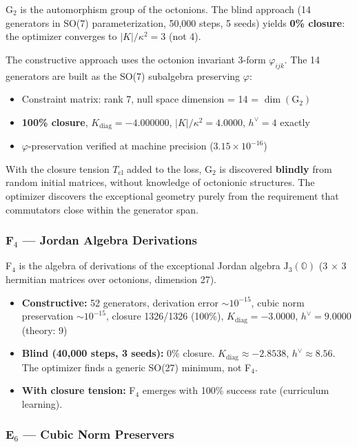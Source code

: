 G$_2$ is the automorphism group of the octonions. The blind approach (14 generators in SO(7) parameterization, 50,000 steps, 5 seeds) yields \textbf{0\% closure}: the optimizer converges to $|K|/\kappa^2 = 3$ (not 4).

The constructive approach uses the octonion invariant 3-form $\varphi_{ijk}$. The 14 generators are built as the SO(7) subalgebra preserving $\varphi$:

\begin{itemize}
\item Constraint matrix: rank 7, null space dimension = 14 = $\dim(\text{G}_2)$
\item \textbf{100\% closure}, $K_{\mathrm{diag}} = -4.000000$, $|K|/\kappa^2 = 4.0000$, $h^\vee = 4$ exactly
\item $\varphi$-preservation verified at machine precision ($3.15 \times 10^{-16}$)
\end{itemize}

With the closure tension $T_{\mathrm{cl}}$ added to the loss, G$_2$ is discovered \textbf{blindly} from random initial matrices, without knowledge of octonionic structures. The optimizer discovers the exceptional geometry purely from the requirement that commutators close within the generator span.

\subsubsection{F$_4$ --- Jordan Algebra Derivations}

F$_4$ is the algebra of derivations of the exceptional Jordan algebra $\mathrm{J}_3(\mathbb{O})$ (3 $\times$ 3 hermitian matrices over octonions, dimension 27).

\begin{itemize}
\item \textbf{Constructive:} 52 generators, derivation error $\sim 10^{-15}$, cubic norm preservation $\sim 10^{-15}$, closure 1326/1326 (100\%), $K_{\mathrm{diag}} = -3.0000$, $h^\vee = 9.0000$ (theory: 9)
\item \textbf{Blind (40,000 steps, 3 seeds):} 0\% closure. $K_{\mathrm{diag}} \approx -2.8538$, $h^\vee \approx 8.56$. The optimizer finds a generic SO(27) minimum, not F$_4$.
\item \textbf{With closure tension:} F$_4$ emerges with 100\% success rate (curriculum learning).
\end{itemize}

\subsubsection{E$_6$ --- Cubic Norm Preservers}

